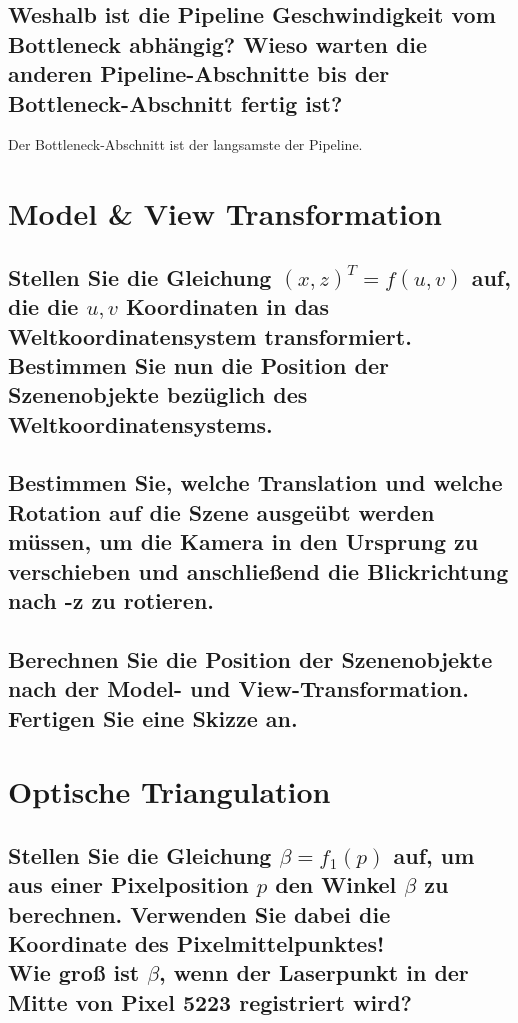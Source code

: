 \documentclass[a4paper,10pt,DIV=14]{scrartcl}
\begin{document}
\subsection{Weshalb ist die Pipeline Geschwindigkeit vom Bottleneck abhängig? Wieso warten die anderen Pipeline-Abschnitte bis der Bottleneck-Abschnitt fertig ist?}
Der Bottleneck-Abschnitt ist der langsamste der Pipeline.


\section{Model \& View Transformation}

\subsection{Stellen Sie die Gleichung $(x, z)^T = f(u,v)$ auf, die die $u, v$ Koordinaten in das Weltkoordinatensystem transformiert. Bestimmen Sie nun die Position der Szenenobjekte bezüglich des Weltkoordinatensystems.}


\subsection{Bestimmen Sie, welche Translation und welche Rotation auf die Szene ausgeübt werden müssen, um die Kamera in den Ursprung zu verschieben und anschließend die Blickrichtung nach -z zu rotieren.}


\subsection{Berechnen Sie die Position der Szenenobjekte nach der Model- und View-Transformation. Fertigen Sie eine Skizze an.}



\section{Optische Triangulation}

\subsection{Stellen Sie die Gleichung $\beta = f_1(p)$ auf, um aus einer Pixelposition $p$ den Winkel $\beta$ zu berechnen. Verwenden Sie dabei die Koordinate des Pixelmittelpunktes! \\ Wie groß ist $\beta$, wenn der Laserpunkt in der Mitte von Pixel 5223 registriert wird?}
\end{document}

